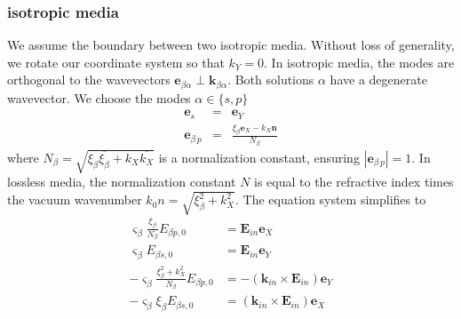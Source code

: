 \documentclass[12pt,a4paper,twoside,openright,BCOR10mm,headsepline,titlepage,abstracton,chapterprefix,final]{scrreprt}
\newcommand\Vector[1]{{\mathbf{#1}}}
\newcommand\wavenumber{k}
\newcommand\Wavevector{\Vector{\wavenumber}}
\newcommand\scalarEfield{E}
\newcommand\Efield{\Vector{\scalarEfield}}
\newcommand\ppol{p}
\newcommand\spol{s}
\newcommand\normconst{N}
\begin{document}
\subsubsection{isotropic media}
We assume the boundary between two isotropic media.
Without loss of generality, we rotate our coordinate system so that $\wavenumber_Y = 0$.
In isotropic media, the modes are orthogonal to the wavevectors $\Vector{e}_{\beta\alpha} \perp \Wavevector_{\beta\alpha}$.
Both solutions $\alpha$ have a degenerate wavevector.
We choose the modes $\alpha \in \{ \spol, \ppol \}$
\begin{eqnarray}
 \Vector{e}_{\spol} &=& \Vector{e}_Y \\
 \Vector{e}_{\beta\,\ppol} &=& \frac{\xi_\beta \Vector{e}_X - \wavenumber_X \Vector{n}}{\normconst_\beta} 
\end{eqnarray}
where $\normconst_\beta = \sqrt{ \xi_\beta \overline{\xi_\beta} + \wavenumber_X \overline{\wavenumber_X}}$ is a normalization constant, ensuring $|\Vector{e}_{\beta\,\ppol}|=1$.
In lossless media, the normalization constant $\normconst$ is equal to the refractive index times the vacuum wavenumber
$\wavenumber_0 n = \sqrt{ \xi_\beta^2 + \wavenumber_X^2}$.
The equation system simplifies to
\begin{subequations}
  \begin{align}
    \varsigma_\beta \frac{\xi_\beta}{\normconst_\beta}  E_{\beta \ppol,0} &= \Efield_{in} \Vector{e}_X \\
    \varsigma_\beta E_{\beta \spol,0} &= \Efield_{in} \Vector{e}_Y \\
    - \varsigma_\beta \frac{\xi_\beta^2 + \wavenumber_X^2}{\normconst_\beta} E_{\beta\ppol,0} &= -(\Wavevector_{in} \times \Efield_{in}) \Vector{e}_Y  \\
    - \varsigma_\beta \xi_{\beta} E_{\beta \spol,0} &= (\Wavevector_{in} \times \Efield_{in}) \Vector{e}_X 
  \end{align}
\end{subequations}
\end{document}
